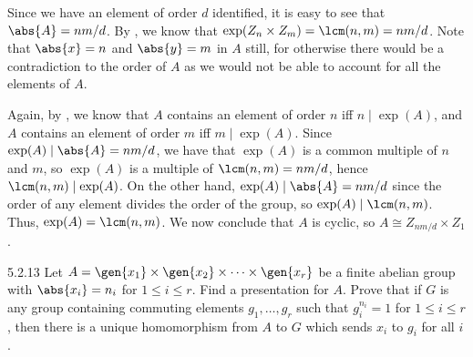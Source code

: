 \begin{sol}
    Since we have an element of order $d$ identified, it is easy to see that $\abs{A} = nm/d$.
	By , we know that $\exp(Z_n \times Z_m) = \lcm(n, m) = nm/d$.
	Note that $\abs{x} = n$ and $\abs{y} = m$ in $A$ still, for otherwise there would be a contradiction to the order of $A$ as we would not be able to account for all the elements of $A$.

    Again, by , we know that $A$ contains an element of order $n$ iff $n \mid \exp(A)$, and $A$ contains an element of order $m$ iff $m \mid \exp(A)$.
	Since $\exp(A) \mid \abs{A} = nm/d$, we have that $\exp(A)$ is a common multiple of $n$ and $m$, so $\exp(A)$ is a multiple of $\lcm(n, m) = nm/d$, hence $\lcm(n, m) \mid \exp(A)$.
	On the other hand, $\exp(A) \mid \abs{A} = nm/d$ since the order of any element divides the order of the group, so $\exp(A) \mid \lcm(n, m)$.
	Thus, $\exp(A) = \lcm(n, m)$.
	We now conclude that $A$ is cyclic, so $A \cong Z_{nm/d} \times Z_1$.
\end{sol}

\begin{exercise}{5.2.13}
    Let $A = \gen{x_1} \times \gen{x_2} \times \cdots \times \gen{x_r}$ be a finite abelian group with $\abs{x_i} = n_i$ for $1 \leq i \leq r$.
	Find a presentation for $A$.
	Prove that if $G$ is any group containing commuting elements $g_1, \ldots, g_r$ such that $g_i^{n_i} = 1$ for $1 \leq i \leq r$, then there is a unique homomorphism from $A$ to $G$ which sends $x_i$ to $g_i$ for all $i$.
\end{exercise}

